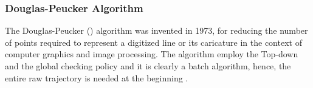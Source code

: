 \subsubsection{Douglas-Peucker Algorithm}



The Douglas-Peucker (\dpa) algorithm \cite{Douglas:Peucker} was invented in 1973, for reducing the number of points required to represent a digitized line or its caricature in the context of computer graphics and image processing.
The \dpa algorithm employ the Top-down and the global checking policy and it is clearly a batch algorithm, hence, the entire raw trajectory is needed at the beginning \cite{Meratnia:Spatiotemporal}.

